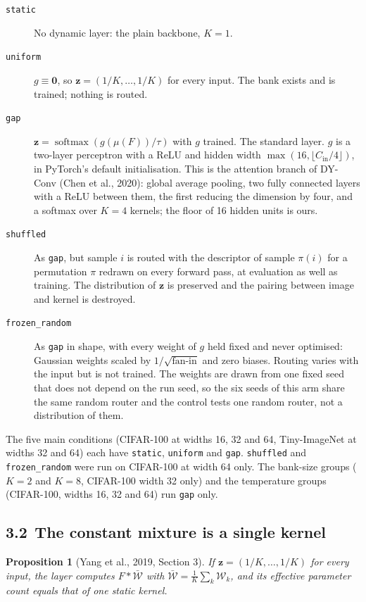 \documentclass{article}
\begin{document}
\begin{description}
\item[\texttt{static}] No dynamic layer: the plain backbone, $K=1$.
\item[\texttt{uniform}] $g\equiv\mathbf{0}$, so $\mathbf{z}=(1/K,\dots,1/K)$ for
every input. The bank exists and is trained; nothing is routed.
\item[\texttt{gap}] $\mathbf{z}=\operatorname{softmax}(g(\mu(F))/\tau)$ with $g$
trained. The standard layer. $g$ is a two-layer perceptron with a ReLU and
hidden width $\max(16,\lfloor C_{\text{in}}/4\rfloor)$, in PyTorch's default
initialisation. This is the attention branch of DY-Conv (Chen et al., 2020):
global average pooling, two fully connected layers with a ReLU between them,
the first reducing the dimension by four, and a softmax over $K=4$ kernels;
the floor of 16 hidden units is ours.
\item[\texttt{shuffled}] As \texttt{gap}, but sample $i$ is routed with
the descriptor of sample $\pi(i)$ for a permutation $\pi$ redrawn on every
forward pass, at evaluation as well as training. The distribution of
$\mathbf{z}$ is preserved and the pairing between image and kernel is
destroyed.
\item[\texttt{frozen\_random}] As \texttt{gap} in shape, with every weight
of $g$ held fixed and never optimised: Gaussian weights scaled by
$1/\sqrt{\text{fan-in}}$ and zero biases. Routing varies with the input but
is not trained. The weights are drawn from one fixed seed that does not
depend on the run seed, so the six seeds of this arm share the same random
router and the control tests one random router, not a distribution of them.
\end{description}
The five main conditions (CIFAR-100 at widths 16, 32 and 64,
Tiny-ImageNet at widths 32 and 64) each have \texttt{static},
\texttt{uniform} and \texttt{gap}. \texttt{shuffled} and
\texttt{frozen\_random} were run on CIFAR-100 at width 64 only. The
bank-size groups ($K=2$ and $K=8$, CIFAR-100 width 32 only) and the
temperature groups (CIFAR-100, widths 16, 32 and 64) run \texttt{gap} only.

\subsection*{3.2 The constant mixture is a single kernel}

\textbf{Proposition 1} (Yang et al., 2019, Section 3). \emph{
If $\mathbf{z}=(1/K,\dots,1/K)$ for every input, the layer computes
$F*\bar{\mathcal{W}}$ with $\bar{\mathcal{W}}=\tfrac1K\sum_k\mathcal{W}_k$,
and its effective parameter count equals that of one static kernel.
}
\end{document}
